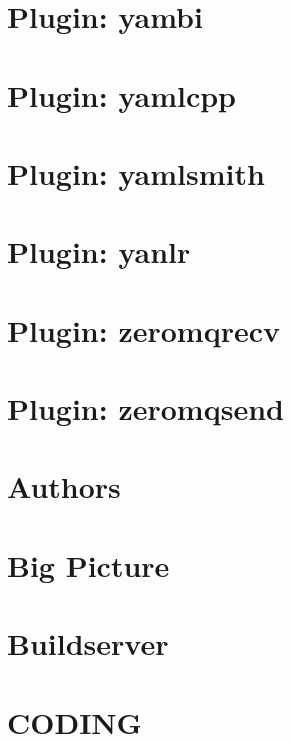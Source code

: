 \let\mypdfximage\pdfximage\def\pdfximage{\immediate\mypdfximage}\documentclass[twoside]{book}
\newcommand{\+}{\discretionary{\mbox{\scriptsize$\hookleftarrow$}}{}{}}
\begin{document}
\chapter{Plugin\+: yambi}
\label{autotoc_md753}

\chapter{Plugin\+: yamlcpp}
\label{autotoc_md780}

\chapter{Plugin\+: yamlsmith}
\label{autotoc_md853}

\chapter{Plugin\+: yanlr}
\label{autotoc_md861}

\chapter{Plugin\+: zeromqrecv}
\label{autotoc_md904}

\chapter{Plugin\+: zeromqsend}
\label{autotoc_md910}

\chapter{Authors}
\label{doc_AUTHORS_md}

\chapter{Big Picture}
\label{doc_BIGPICTURE_md}

\chapter{Buildserver}
\label{doc_BUILDSERVER_md}

\chapter{C\+O\+D\+I\+NG}
\label{doc_CODING_md}

\end{document}
